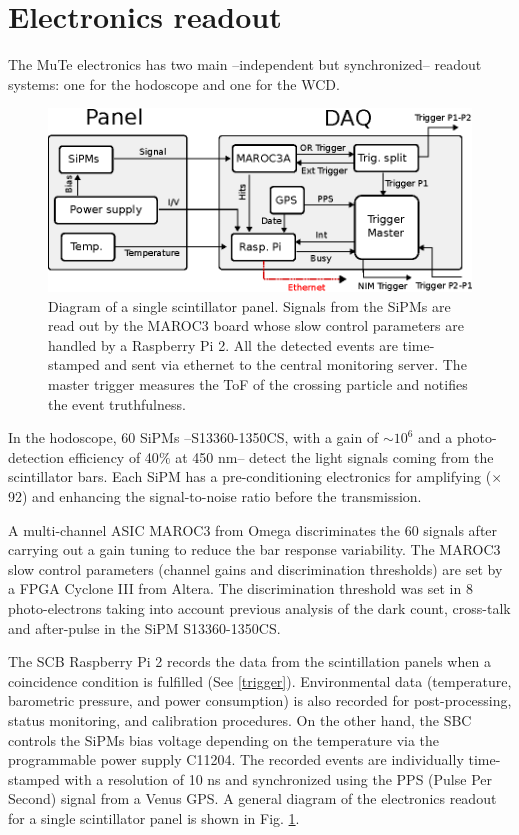 \documentclass[letterpaper,11pt]{article}
\begin{document}
\section{Electronics readout}
\label{daq}
The MuTe electronics has two main --independent but synchronized-- readout systems: one for the hodoscope and one for the WCD. 

\begin{figure}[htb]
\centering
\includegraphics[width=0.8\columnwidth]{Figures/DAQ.eps}
\caption{Diagram of a single scintillator panel. Signals from the SiPMs are read out by the MAROC3 board whose slow control parameters are handled by a Raspberry Pi 2. All the detected events are time-stamped and sent via ethernet to the central monitoring server. The master trigger measures the ToF of the crossing particle and notifies the event truthfulness.}
  \label{fig:scintillatordetector1}
\end{figure}

In the hodoscope, 60 SiPMs --S13360-1350CS, with a gain of $\sim 10^6$ and a photo-detection efficiency of 40$\%$ at 450 nm-- detect the light signals coming from the scintillator bars. Each SiPM has a pre-conditioning electronics for amplifying ($\times$ 92) and enhancing the signal-to-noise ratio before the transmission. 

A multi-channel ASIC MAROC3 from Omega discriminates the 60 signals after carrying out a gain tuning to reduce the bar response variability. The MAROC3 slow control parameters (channel gains and discrimination thresholds) are set by a FPGA Cyclone III from Altera. The discrimination threshold was set in 8 photo-electrons taking into account previous analysis of the dark count, cross-talk and after-pulse in the SiPM S13360-1350CS.

The SCB Raspberry Pi 2 records the data from the scintillation panels when a coincidence condition is fulfilled (See \ref{trigger}). Environmental data (temperature, barometric pressure, and power consumption) is also recorded for post-processing, status monitoring, and calibration procedures. On the other hand, the SBC controls the SiPMs bias voltage depending on the temperature via the programmable power supply C11204. The recorded events are individually time-stamped with a resolution of 10 ns and synchronized using the PPS (Pulse Per Second) signal from a Venus GPS. A general diagram of the electronics readout for a single scintillator panel is shown in Fig. \ref{fig:scintillatordetector1}.
\end{document}
